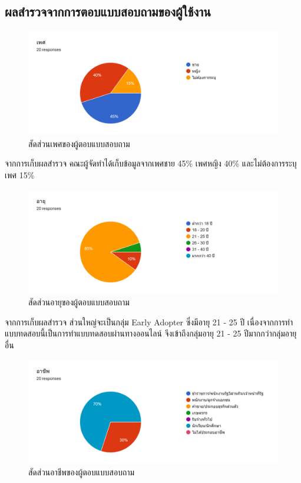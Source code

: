 \documentclass[12pt,oneside,openright,a4paper]{cpe-thai-project}
\begin{document}
    \subsection{ผลสำรวจจากการตอบแบบสอบถามของผู้ใช้งาน}
      \begin{figure}[!ht]\centering
        \includegraphics[width=\textwidth]{./img/test/gender.png}
        \caption{สัดส่วนเพศของผู้ตอบแบบสอบถาม}\label{fig:user_test_gender}
      \end{figure}
      
      \hspace{1cm}จากการเก็บผลสำรวจ คณะผู้จัดทำได้เก็บข้อมูลจากเพศชาย 45\% เพศหญิง 40\% และไม่ต้องการระบุเพศ 15\%
      \begin{figure}[!ht]\centering
        \includegraphics[width=\textwidth]{./img/test/age.png}
        \caption{สัดส่วนอายุของผู้ตอบแบบสอบถาม}\label{fig:user_test_age}
      \end{figure}
      
      \hspace{1cm}จากการเก็บผลสำรวจ ส่วนใหญ่จะเป็นกลุ่ม Early Adopter ซึ่งมีอายุ 21 - 25 ปี
      เนื่องจากการทำแบบทดสอบนี้เป็นการทำแบบทดสอบผ่านทางออนไลน์ จึงเข้าถึงกลุ่มอายุ 21 - 25 ปีมากกว่ากลุ่มอายุอื่น
      \newpage
      \begin{figure}[!ht]\centering
        \includegraphics[width=\textwidth]{./img/test/job.png}
        \caption{สัดส่วนอาชีพของผู้ตอบแบบสอบถาม}\label{fig:user_test_job}
      \end{figure}
      
\end{document}
